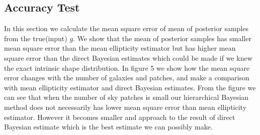 \documentclass[useAMS,usenatbib]{mn2e}
\begin{document}
\subsection{Accuracy Test}

In this section we calculate the mean square error of mean of posterior samples from the true(input) $g$.  We show that the mean of posterior samples has smaller mean square error than the mean ellipticity estimator but has higher mean square error than the direct Bayesian estimates which could be made if we knew the exact intrinsic shape distribution.
In figure 5 we show how the mean square error changes with the number of galaxies and patches, and make a comparison with mean ellipticity estimator and direct Bayesian estimates. From the figure we can see that when the number of sky patches is small our hierarchical Bayesian method does not necessarily has lower mean square error than mean ellipticity estimator. However it becomes smaller and approach to the result of direct Bayesian estimate which is the best estimate we can possibly make.
\end{document}

